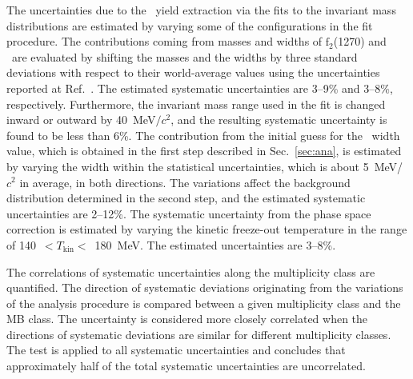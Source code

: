 The uncertainties due to the \fzero~yield extraction via the fits to the invariant mass distributions are estimated by varying some of the configurations in the fit procedure. The contributions coming from masses and widths of $\mathrm{f}_{2}$(1270) and \rhoz~are evaluated by shifting the masses and the widths by three standard deviations with respect to their world-average values using the uncertainties reported at Ref.~\cite{ParticleDataGroup:2022pth}. The estimated systematic uncertainties are 3--9\% and 3--8\%, respectively. Furthermore, the invariant mass range used in the fit is changed inward or outward by 40~MeV$/c^{2}$, and the resulting systematic uncertainty is found to be less than 6\%. The contribution from the initial guess for the \fzero~width value, which is obtained in the first step described in Sec.~\ref{sec:ana}, is estimated by varying the width within the statistical uncertainties, which is about 5~MeV/$c{^2}$ in average, in both directions. The variations affect the background distribution determined in the second step, and the estimated systematic uncertainties are 2--12\%. The systematic uncertainty from the phase space correction is estimated by varying the kinetic freeze-out temperature in the range of 140~$<T_{\mathrm{kin}}<$~180~MeV. The estimated uncertainties are 3--8\%. 

The correlations of systematic uncertainties along the multiplicity class are quantified. The direction of systematic deviations originating from the variations of the analysis procedure is compared between a given multiplicity class and the MB class. The uncertainty is considered more closely correlated when the directions of systematic deviations are similar for different multiplicity classes. The test is applied to all systematic uncertainties and concludes that approximately half of the total systematic uncertainties are uncorrelated.